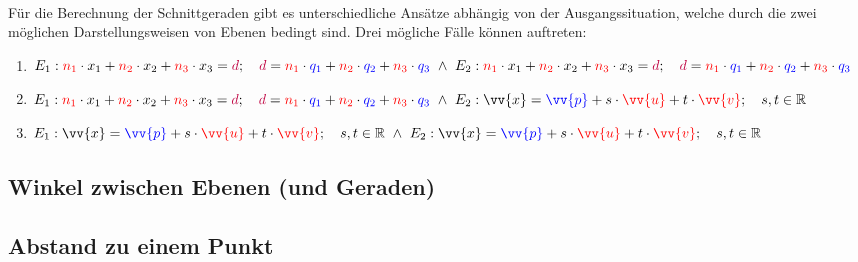         \paragraph{} Für die Berechnung der Schnittgeraden gibt es unterschiedliche Ansätze abhängig von der
        Ausgangssituation, welche durch die zwei möglichen Darstellungsweisen von Ebenen bedingt sind. Drei mögliche
        Fälle können auftreten:
        \begin{enumerate}[1)]
            \item $E_1:\textcolor{red}{n_1} \cdot x_1 + \textcolor{red}{n_2} \cdot x_2 + \textcolor{red}{n_3} \cdot x_3 = \textcolor{purple}{d} ; \quad \textcolor{purple}{d} = \textcolor{red}{n_1} \cdot \textcolor{blue}{q_1} + \textcolor{red}{n_2} \cdot \textcolor{blue}{q_2} + \textcolor{red}{n_3} \cdot \textcolor{blue}{q_3} \text{ } \land \text{ } E_2:\textcolor{red}{n_1} \cdot x_1 + \textcolor{red}{n_2} \cdot x_2 + \textcolor{red}{n_3} \cdot x_3 = \textcolor{purple}{d} ; \quad \textcolor{purple}{d} = \textcolor{red}{n_1} \cdot \textcolor{blue}{q_1} + \textcolor{red}{n_2} \cdot \textcolor{blue}{q_2} + \textcolor{red}{n_3} \cdot \textcolor{blue}{q_3}$
            \item $E_1:\textcolor{red}{n_1} \cdot x_1 + \textcolor{red}{n_2} \cdot x_2 + \textcolor{red}{n_3} \cdot x_3 = \textcolor{purple}{d} ; \quad \textcolor{purple}{d} = \textcolor{red}{n_1} \cdot \textcolor{blue}{q_1} + \textcolor{red}{n_2} \cdot \textcolor{blue}{q_2} + \textcolor{red}{n_3} \cdot \textcolor{blue}{q_3} \text{ } \land \text{ } E_2:\vv{x}=\textcolor{blue}{\vv{p}} + s\cdot \textcolor{red}{\vv{u}} + t\cdot \textcolor{red}{\vv{v}};\quad s,t\in\R$
            \item $E_1:\vv{x}=\textcolor{blue}{\vv{p}} + s\cdot \textcolor{red}{\vv{u}} + t\cdot \textcolor{red}{\vv{v}};\quad s,t\in\R \text{ } \land \text{ } E_2:\vv{x}=\textcolor{blue}{\vv{p}} + s\cdot \textcolor{red}{\vv{u}} + t\cdot \textcolor{red}{\vv{v}};\quad s,t\in\R$
        \end{enumerate}
        

    \subsection{Winkel zwischen Ebenen (und Geraden)}

    \subsection{Abstand zu einem Punkt}



